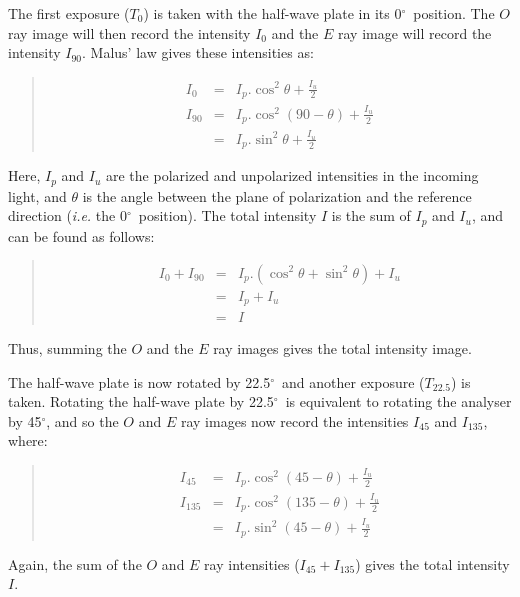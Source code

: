 \documentclass[twoside,11pt]{starlink}
\newenvironment{myquote}{\begin{quote}\begin{small}}{\end{small}\end{quote}}
\providecommand{\dgs}{\hbox{$^\circ$}}
\begin{document}
The first exposure ($T_{0}$) is taken with the half-wave plate in its 0\dgs\
position. The $O$ ray image will then record the intensity $I_{0}$ and
the $E$ ray image will record the intensity $I_{90}$. Malus' law gives
these intensities as:

\begin{myquote}
\begin{eqnarray*}
  I_{0} & = & I_{p}.\cos^{2}\theta + \frac{I_{u}}{2} \\
 I_{90} & = & I_{p}.\cos^{2}(90 - \theta) + \frac{I_{u}}{2} \\
        & = & I_{p}.\sin^{2}\theta + \frac{I_{u}}{2}
\end{eqnarray*}
\end{myquote}

Here, $I_{p}$ and $I_{u}$ are the polarized and unpolarized intensities
in the incoming light, and $\theta$ is the angle between the plane of
polarization and the reference direction (\emph{i.e.} the 0\dgs\ position). The
total intensity $I$ is the sum of $I_{p}$ and $I_{u}$, and can be found
as follows:
\begin{myquote}
\begin{eqnarray*}
  I_{0} + I_{90} & = & I_{p}.(\cos^{2}\theta + \sin^{2}\theta) + I_{u} \\
                 & = & I_{p} + I_{u} \\
                 & = & I
\end{eqnarray*}
\end{myquote}

Thus, summing the $O$ and the $E$ ray images gives the total intensity
image.

The half-wave plate is now rotated by 22.5\dgs\ and another exposure
($T_{22.5}$) is taken. Rotating the half-wave plate by 22.5\dgs\ is
equivalent to rotating the analyser by 45\dgs, and so the $O$ and $E$ ray
images now record the intensities $I_{45}$ and $I_{135}$, where:
\begin{myquote}
\begin{eqnarray*}
  I_{45} & = & I_{p}.\cos^{2}(45 - \theta) + \frac{I_{u}}{2} \\
 I_{135} & = & I_{p}.\cos^{2}(135 - \theta) + \frac{I_{u}}{2} \\
         & = & I_{p}.\sin^{2}(45 - \theta) + \frac{I_{u}}{2}
\end{eqnarray*}
\end{myquote}

Again, the sum of the $O$ and $E$ ray intensities ($I_{45}+I_{135}$)
gives the total intensity $I$.
\end{document}
